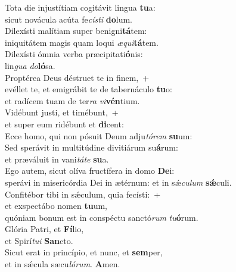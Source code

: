 \evenverse Tota die injustítiam cogitávit lingua \textbf{tu}a:~\*\\
\evenverse sicut novácula acúta fe\textit{cí}\textit{sti} \textbf{do}lum.\\
\oddverse Dilexísti malítiam super benigni\textbf{tá}tem:~\*\\
\oddverse iniquitátem magis quam loqui \textit{æ}\textit{qui}\textbf{tá}tem.\\
\evenverse Dilexísti ómnia verba præcipitati\textbf{ó}nis:~\*\\
\evenverse lin\textit{gua} \textit{do}\textbf{ló}sa.\\
\oddverse Proptérea Deus déstruet te in finem,~+\\
\oddverse  evéllet te, et emigrábit te de tabernáculo \textbf{tu}o:~\*\\
\oddverse et radícem tuam de ter\textit{ra} \textit{vi}\textbf{vén}tium.\\
\evenverse Vidébunt justi, et timébunt,~+\\
\evenverse  et super eum ridébunt et \textbf{di}cent:~\*\\
\evenverse Ecce homo, qui non pósuit Deum adju\textit{tó}\textit{rem} \textbf{su}um:\\
\oddverse Sed sperávit in multitúdine divitiárum su\textbf{á}rum:~\*\\
\oddverse et præváluit in vani\textit{tá}\textit{te} \textbf{su}a.\\
\evenverse Ego autem, sicut olíva fructífera in domo \textbf{De}i:~\*\\
\evenverse sperávi in misericórdia Dei in ætérnum: et in sǽ\textit{cu}\textit{lum} \textbf{sǽ}culi.\\
\oddverse Confitébor tibi in sǽculum, quia fecísti:~+\\
\oddverse  et exspectábo nomen \textbf{tu}um,~\*\\
\oddverse quóniam bonum est in conspéctu sanctó\textit{rum} \textit{tu}\textbf{ó}rum.\\
\evenverse Glória Patri, et \textbf{Fí}lio,~\*\\
\evenverse et Spirí\textit{tu}\textit{i} \textbf{San}cto.\\
\oddverse Sicut erat in princípio, et nunc, et \textbf{sem}per,~\*\\
\oddverse et in sǽcula sæcu\textit{ló}\textit{rum}. \textbf{A}men.\\

